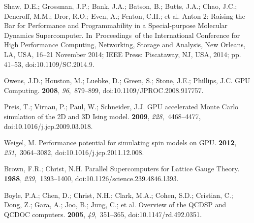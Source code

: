 \documentclass[computation,article,accept,moreauthors,pdftex]{Definitions/mdpi}
\begin{document}
\begin{thebibliography}{999}
Shaw, D.E.; Grossman, J.P.; Bank, J.A.; Batson, B.; Butts, J.A.; Chao, J.C.;
 Deneroff, M.M.; Dror, R.O.; Even, A.; Fenton, C.H.; et al.
\newblock Anton 2: Raising the Bar for Performance and Programmability in a
 Special-purpose Molecular Dynamics Supercomputer.
\newblock In~Proceedings~of the International Conference for High Performance
 Computing, Networking, Storage and Analysis, New Orleans, LA, USA, 16--21 November 2014; IEEE Press: Piscataway, NJ, USA,
 2014; pp. 41--53, doi:10.1109/SC.2014.9.

{Owens}, J.D.; {Houston}, M.; {Luebke}, D.; {Green}, S.; {Stone}, J.E.;
 {Phillips}, J.C.
\newblock GPU Computing.
 {\bf 2008}, {\em 96},~879--899, doi:10.1109/JPROC.2008.917757.

Preis, T.; Virnau, P.; Paul, W.; Schneider, J.J.
\newblock GPU accelerated Monte Carlo simulation of the 2D and 3D Ising model.
 {\bf 2009}, {\em 228},~4468--4477, doi:10.1016/j.jcp.2009.03.018.

Weigel, M.
\newblock Performance potential for simulating spin models on GPU.
 {\bf 2012}, {\em 231},~3064--3082, doi:10.1016/j.jcp.2011.12.008.

Brown, F.R.; Christ, N.H.
\newblock Parallel Supercomputers for Lattice Gauge Theory.
 {\bf 1988}, {\em 239},~1393--1400, doi:10.1126/science.239.4846.1393.

{Boyle}, P.A.; {Chen}, D.; {Christ}, N.H.; {Clark}, M.A.; {Cohen}, S.D.;
 {Cristian}, C.; {Dong}, Z.; {Gara}, A.; {Joo}, B.; {Jung}, C.; et al.
\newblock Overview of the QCDSP and QCDOC computers.
 {\bf 2005}, {\em
 49},~351--365, doi:10.1147/rd.492.0351.


\end{thebibliography}
\end{document}
